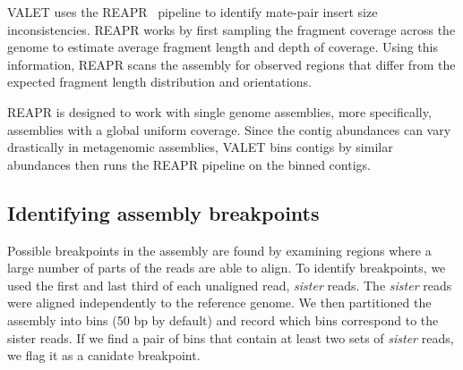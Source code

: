 \documentclass{bioinfo}
\begin{document}
VALET uses the REAPR~\citep{hunt2013reapr} pipeline to identify mate-pair insert size inconsistencies.  REAPR works by first sampling the fragment coverage across the genome to estimate average fragment length and depth of coverage.  Using this information, REAPR scans the assembly for observed regions that differ from the expected fragment length distribution and orientations.

REAPR is designed to work with single genome assemblies, more specifically, assemblies with a global uniform coverage.  Since the contig abundances can vary drastically in metagenomic assemblies, VALET bins contigs by similar abundances then runs the REAPR pipeline on the binned contigs.

\subsection{Identifying assembly breakpoints}

Possible breakpoints in the assembly are found by examining regions where a large number of parts of the reads are able to align.
To identify breakpoints, we used the first and last third of each unaligned read, \emph{sister} reads.
The \emph{sister} reads were aligned independently to the reference genome.
We then partitioned the assembly into bins (50 bp by default) and record which bins correspond to the sister reads.
If we find a pair of bins that contain at least two sets of \textit{sister} reads, we flag it as a canidate breakpoint.

\end{document}
